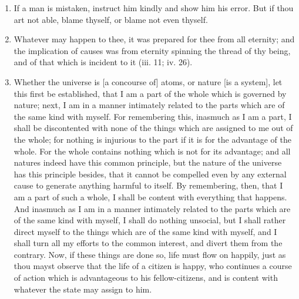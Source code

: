 \begin{enumerate}
\item If a man is mistaken, instruct him kindly and show him his error. But if thou art not able, blame thyself, or blame not even thyself.

\item Whatever may happen to thee, it was prepared for thee from all eternity; and the implication of causes was from eternity spinning the thread of thy being, and of that which is incident to it (iii. 11; iv. 26).

\item Whether the universe is [{\clarify a concourse of}] atoms, or nature [{\clarify is a system}], let this first be established, that I am a part of the whole which is governed by nature; next, I am in a manner intimately related to the parts which are of the same kind with myself. For remembering this, inasmuch as I am a part, I shall be discontented with none of the things which are assigned to me out of the whole; for nothing is injurious to the part if it is for the advantage of the whole. For the whole contains nothing which is not for its advantage; and all natures indeed have this common principle, but the nature of the universe has this principle besides, that it cannot be compelled even by any external cause to generate anything harmful to itself. By remembering, then, that I am a part of such a whole, I shall be content with everything that happens. And inasmuch as I am in a manner intimately related to the parts which are of the same kind with myself, I shall do nothing unsocial, but I shall rather direct myself to the things which are of the same kind with myself, and I shall turn all my efforts to the common interest, and divert them from the contrary. Now, if these things are done so, life must flow on happily, just as thou mayst observe that the life of a citizen is happy, who continues a course of action which is advantageous to his fellow-citizens, and is content with whatever the state may assign to him.


\end{enumerate}
